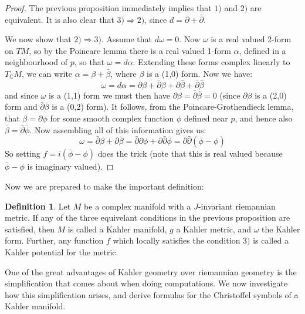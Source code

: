 \documentclass[11pt]{amsart}
\theoremstyle{definition}
\newtheorem{definition}[subsection]{Definition}
\def \C{ \mathbb{C} }
\def \del{ \partial }
\def \delbar{ \bar{\partial} }
\begin{document}
%
\begin{proof}
The previous proposition immediately implies that $1)$ and $2)$ are equivalent. It is also clear that $3) \Rightarrow 2)$, since $d = \del + \delbar$.

We now show that $2) \Rightarrow 3)$.  Assume that $d \omega = 0$.  Now $\omega$ is a real valued 2-form on $TM$, so by the Poincare lemma there is a real valued 1-form $\alpha$, defined in a neighbourhood of $p$, so that $\omega = d \alpha$.  Extending these forms complex linearly to $T_{\C}M$, we can write $\alpha = \beta + \bar{\beta}$, where $\beta$ is a (1,0) form.  Now we have:
%
$$\omega = d \alpha = \del \beta + \delbar \beta + \del \bar{\beta} + \delbar \bar{\beta}$$
%
and since $\omega$ is a (1,1) form we must then have $\del \beta = \delbar \bar{\beta} = 0$ (since $\del \beta$ is a (2,0) form and $\delbar \bar{\beta}$ is a (0,2) form).  It follows, from the Poincare-Grothendieck lemma, that $\beta = \del \phi$ for some smooth complex function $\phi$ defined near $p$, and hence also $ \bar{\beta} = \delbar \bar{\phi} $.  Now assembling all of this information gives us:
%
$$ \omega = \delbar \beta + \del \bar{\beta} = \delbar \del \phi + \del \delbar \bar{\phi} = \del \delbar( \bar{\phi} - \phi ) $$
%
So setting $f = i( \bar{\phi} - \phi )$ does the trick (note that this is real valued because $\bar{\phi} - \phi$ is imaginary valued).
%
\end{proof}
%
Now we are prepared to make the important definition:
%
\begin{definition} Let $M$ be a complex manifold with a $J$-invariant riemannian metric.  If any of the three equivelant conditions in the previous proposition are satisfied, then $M$ is called a Kahler manifold, $g$ a Kahler metric, and $\omega$ the Kahler form.  Further, any function $f$ which locally satisfies the condition $3)$ is called a Kahler potential for the metric.
\end{definition}

One of the great advantages of Kahler geometry over riemannian geometry is the simplification that comes about when doing computations.  We now investigate how this simplification arises, and derive formulas for the Christoffel symbols of a Kahler manifold.
\end{document}
